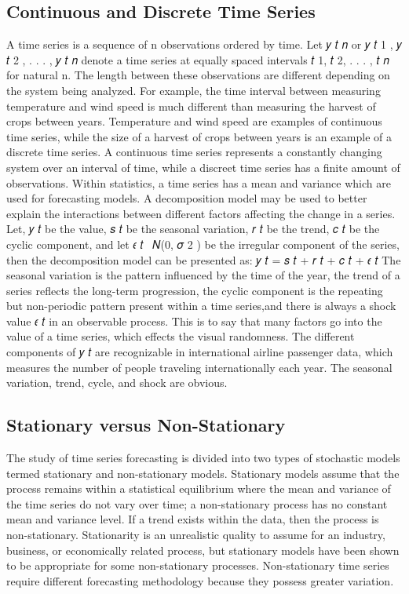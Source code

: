\documentclass[../main.tex]{subfiles}
\begin{document}
    \subsection{Continuous and Discrete Time Series}\label{subsec:continuous-and-discrete-time-series}
    A time series is a sequence of n observations ordered by time.
    Let {𝑦 𝑡 𝑛 } or 𝑦 𝑡 1 , 𝑦 𝑡 2 , . . . , 𝑦 𝑡 𝑛 denote a time series at equally spaced intervals 𝑡 1, 𝑡 2, . . . , 𝑡 𝑛 for natural n.
    The length between these observations are different depending on the system being analyzed.
    For example, the time interval between measuring temperature and wind speed is much different than measuring the harvest of crops between years.
    Temperature and wind speed are examples of continuous time series, while the size of a harvest of crops between years is an example of a discrete time series.
    A continuous time series represents a constantly changing system over an interval of time, while a discreet time series has a finite amount of observations.
    Within statistics, a time series has a mean and variance which are used for forecasting models.
    A decomposition model may be used to better explain the interactions between different factors affecting the change in a series.
    Let, 𝑦 𝑡 be the value, 𝑠 𝑡 be the seasonal variation, 𝑟 𝑡 be the trend, 𝑐 𝑡 be the cyclic component, and let 𝜖 𝑡 ~𝑁(0, 𝜎 2 ) be the irregular component of the series, then the decomposition model can be presented as:
    𝑦 𝑡 = 𝑠 𝑡 + 𝑟 𝑡 + 𝑐 𝑡 + 𝜖 𝑡
    The seasonal variation is the pattern influenced by the time of the year, the trend of a series reflects the long-term progression, the cyclic component is the repeating but non-periodic pattern present within a time series,and there is always a shock value 𝜖 𝑡 in an observable process.
    This is to say that many factors go into the value of a time series, which effects the visual randomness.
    The different components of 𝑦 𝑡 are recognizable in international airline passenger data, which measures the number of people traveling internationally each year.
    The seasonal variation, trend, cycle, and shock are obvious.

    \subsection{Stationary versus Non-Stationary}\label{subsec:stationary-versus-non-stationary}
    The study of time series forecasting is divided into two types of stochastic models termed stationary and non-stationary models.
    Stationary models assume that the process remains within a statistical equilibrium where the mean and variance of the time series do not
    vary over time; a non-stationary process has no constant mean and variance level.
    If a trend exists within the data, then the process is non-stationary.
    Stationarity is an unrealistic quality to assume for an industry, business, or economically related process, but stationary models have been shown to be appropriate for some non-stationary processes. %
    Non-stationary time series require different forecasting methodology because they possess greater variation.
\end{document}
